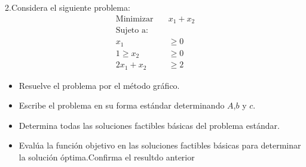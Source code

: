 \documentclass{article}
\begin{document}
2.Considera el siguiente problema:
\begin{equation*}
   \begin{aligned}
    \text{Minimizar}\quad & x_1+x_2\\
    \text{Sujeto a:} &\\
    x_1 & \geq 0\\
   1 \geq x_2 & \geq 0\\
   2x_1+x_2 & \geq 2
 \end{aligned}
\end{equation*}
\begin{itemize}
\item Resuelve el problema por el método gráfico.
\item Escribe el problema en su forma estándar determinando $A$,$b$  y $c.$
\item Determina todas las soluciones factibles básicas del problema estándar.
\item Evalúa la función objetivo en las soluciones factibles básicas para determinar la solución óptima.Confirma el resultdo anterior
\end{itemize}
\end{document}
